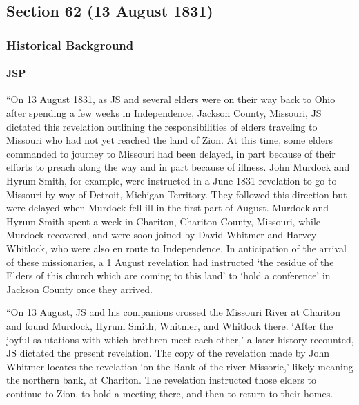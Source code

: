 \subsection{Section 62 (13 August 1831)}
	\label{DC62}
	
	\subsubsection{Historical Background}
		\label{DC62-HB}
		
		\paragraph{JSP}
		
			``On 13 August 1831, as JS and several elders were on their way back to Ohio after spending a few weeks in Independence, Jackson County, Missouri, JS dictated this revelation outlining the responsibilities of elders traveling to Missouri who had not yet reached the land of Zion. At this time, some elders commanded to journey to Missouri had been delayed, in part because of their efforts to preach along the way and in part because of illness. John Murdock and Hyrum Smith, for example, were instructed in a June 1831 revelation to go to Missouri by way of Detroit, Michigan Territory. They followed this direction but were delayed when Murdock fell ill in the first part of August. Murdock and Hyrum Smith spent a week in Chariton, Chariton County, Missouri, while Murdock recovered, and were soon joined by David Whitmer and Harvey Whitlock, who were also en route to Independence. In anticipation of the arrival of these missionaries, a 1 August revelation had instructed `the residue of the Elders of this church which are coming to this land' to `hold a conference' in Jackson County once they arrived.
			
			``On 13 August, JS and his companions crossed the Missouri River at Chariton and found Murdock, Hyrum Smith, Whitmer, and Whitlock there. `After the joyful salutations with which brethren meet each other,' a later history recounted, JS dictated the present revelation. The copy of the revelation made by John Whitmer locates the revelation `on the Bank of the river Missorie,' likely meaning the northern bank, at Chariton. The revelation instructed those elders to continue to Zion, to hold a meeting there, and then to return to their homes.
			
